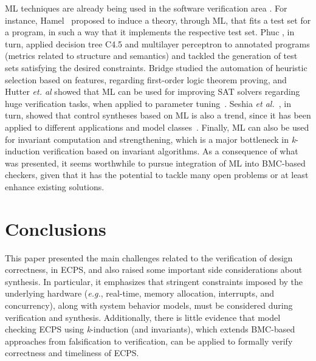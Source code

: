 \documentclass[format=acmsmall, review=false, screen=true]{acmart}
\begin{document}
{{ML techniques are already being used in the software verification area \cite{mlswverif,nguyen,bridge,babic07}. For instance, Hamel~\cite{mlswverif} proposed to induce a theory, through ML, that fits a test set for a program, in such a way that it implements the respective test set. Phuc \cite{nguyen}, in turn, applied decision tree C4.5 and multilayer perceptron to annotated programs (metrics related to structure and semantics) and tackled the generation of test sets satisfying the desired constraints. Bridge studied the automation of heuristic selection based on features, regarding first-order logic theorem proving, and Hutter {\it et. al} \cite{babic07} showed that ML can be used for improving SAT solvers regarding huge verification tasks, when applied to parameter tuning~\cite{babic07}. Seshia {\it et al.}~\cite{Seshia17}, in turn, showed that control syntheses based on ML is also a trend, since it has been applied to different applications and model classes~\cite{Jha10,Sadigh14}. Finally, ML can also be used for invariant computation and strengthening, which is a major bottleneck in \textit{k}-induction verification based on invariant algorithms. As a consequence of what was presented, it seems worthwhile to pursue integration of ML into BMC-based checkers, given that it has the potential to tackle many open problems or at least enhance existing solutions. 

\section{Conclusions}
\label{conclusions}

This paper presented the main challenges related to the verification of design correctness, in ECPS, and also raised some important side considerations about synthesis. In particular, it emphasizes that stringent constraints imposed by the underlying hardware ({\it e.g.}, real-time, memory allocation, interrupts, and concurrency), along with system behavior models, must be considered during verification and synthesis. Additionally, there is little evidence that model checking ECPS using \textit{k}-induction (and invariants), which extends BMC-based approaches from falsification to verification, can be applied to formally verify correctness and timeliness of ECPS. 

}}
\end{document}
